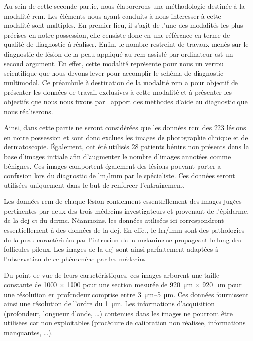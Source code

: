 \renewcommand{\thechapter}{\roman{chapter}}
\setcounter{chapter}{3}
\setcounter{figure}{0}

\label{chap:preamble_microscopy}
Au sein de cette seconde partie, nous élaborerons une méthodologie destinée à la modalité \gls{rcm}. Les éléments nous ayant conduits à nous intéresser à cette modalité sont multiples. En premier lieu, il s'agit de l'une des modalités les plus précises en notre possession, elle consiste donc en une référence en terme de qualité de diagnostic à réaliser. Enfin, le nombre restreint de travaux menés sur le diagnostic de lésion de la peau appliqué au \gls{rcm} assisté par ordinateur est un second argument. En effet, cette modalité représente pour nous un verrou scientifique que nous devons lever pour accomplir le schéma de diagnostic multimodal. Ce préambule à destination de la modalité \gls{rcm} a pour objectif de présenter les données de travail exclusives à cette modalité et à présenter les objectifs que nous nous fixons par l'apport des méthodes d'aide au diagnostic que nous réaliserons.\par

Ainsi, dans cette partie ne seront considérées que les données \gls{rcm} des 223 lésions en notre possession et sont donc exclues les images de photographie clinique et de dermatoscopie. Également, ont été utilisés 28 patients bénins non présents dans la base d'images initiale afin d'augmenter le nombre d'images annotées comme bénignes. Ces images comportent également des lésions pouvant porter a confusion lors du diagnostic de \gls{lm}/\gls{lmm} par le spécialiste. Ces données seront utilisées uniquement dans le but de renforcer l'entraînement.\par

Les données \gls{rcm} de chaque lésion contiennent essentiellement des images jugées pertinentes par deux des trois médecins investigateurs et provenant de l'épiderme, de la \gls{dej} et du derme. Néanmoins, les données utilisées ici correspondront essentiellement à des données de la \gls{dej}. En effet, le \gls{lm}/\gls{lmm} sont des pathologies de la peau caractérisées par l'intrusion de la mélanine se propageant le long des follicules pileux. Les images de la \gls{dej} sont ainsi parfaitement adaptées à l'observation de ce phénomène par les médecins.\par

Du point de vue de leurs caractéristiques, ces images arborent une taille constante de \SI{1000}{\px} $\times$ \SI{1000}{\px} pour une section mesurée de \SI{920}{\micro\metre} $\times$ \SI{920}{\micro\metre} pour une résolution en profondeur comprise entre \SIrange{3}{5}{\micro\metre}. Ces données fournissent ainsi une résolution de l'ordre du \SI{1}{\micro\metre}. Les informations d'acquisition (profondeur, longueur d'onde, \ldots) contenues dans les images ne pourront être utilisées car non exploitables (procédure de calibration non réalisée, informations manquantes, \ldots).\par

